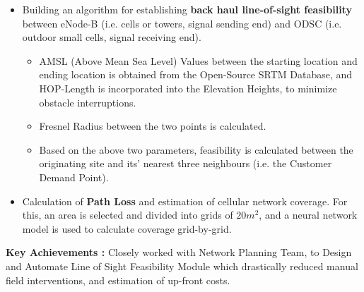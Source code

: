 \begin{itemize}
	\item Building an algorithm for establishing \textbf{back haul line-of-sight feasibility} between eNode-B (i.e. cells or towers, signal sending end) and ODSC (i.e. outdoor small cells, signal receiving end).
	
	\begin{itemize}
		\item AMSL (Above Mean Sea Level) Values between the starting location and ending location is obtained from the Open-Source SRTM Database, and HOP-Length is incorporated into the Elevation Heights, to minimize obstacle interruptions.
		
		\item Fresnel Radius between the two points is calculated.
		
		\item Based on the above two parameters, feasibility is calculated between the originating site and its’ nearest three neighbours (i.e. the Customer Demand Point).
	\end{itemize}

	\item Calculation of \textbf{Path Loss} and estimation of cellular network coverage. For this, an area is selected and divided into grids of $20 m^2$, and a neural network model is used to calculate coverage grid-by-grid.
\end{itemize}

\textbf{Key Achievements :} Closely worked with Network Planning Team, to Design and Automate Line of Sight Feasibility Module which drastically reduced manual field interventions, and estimation of up-front costs.

